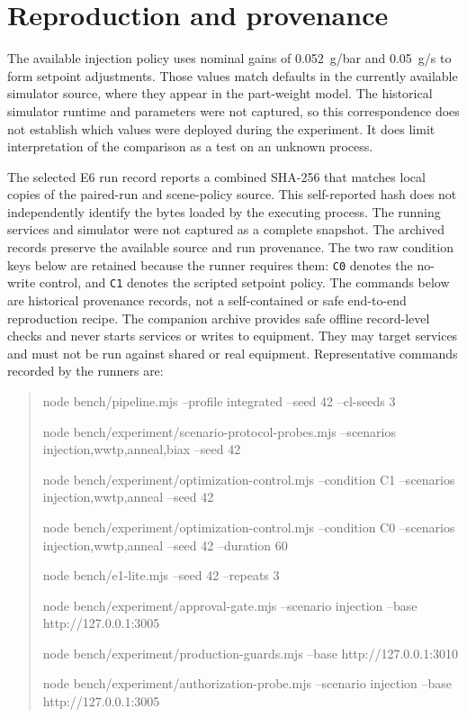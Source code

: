\documentclass[10pt]{article}
\begin{document}
\section*{Reproduction and provenance}
The available injection policy uses nominal gains of 0.052~g/bar and 0.05~g/s to form setpoint adjustments. Those values match defaults in the currently available simulator source, where they appear in the part-weight model. The historical simulator runtime and parameters were not captured, so this correspondence does not establish which values were deployed during the experiment. It does limit interpretation of the comparison as a test on an unknown process.

The selected E6 run record reports a combined SHA-256 that matches local copies of the paired-run and scene-policy source. This self-reported hash does not independently identify the bytes loaded by the executing process. The running services and simulator were not captured as a complete snapshot. The archived records preserve the available source and run provenance. The two raw condition keys below are retained because the runner requires them: \texttt{C0} denotes the no-write control, and \texttt{C1} denotes the scripted setpoint policy. The commands below are historical provenance records, not a self-contained or safe end-to-end reproduction recipe. The companion archive provides safe offline record-level checks and never starts services or writes to equipment. They may target services and must not be run against shared or real equipment. Representative commands recorded by the runners are:
\begin{quote}
\footnotesize\ttfamily\raggedright
node bench/pipeline.mjs --profile integrated --seed 42 --cl-seeds 3\par\smallskip
node bench/experiment/scenario-protocol-probes.mjs --scenarios injection,wwtp,anneal,biax --seed 42\par\smallskip
node bench/experiment/optimization-control.mjs --condition C1 --scenarios injection,wwtp,anneal --seed 42\par\smallskip
node bench/experiment/optimization-control.mjs --condition C0 --scenarios injection,wwtp,anneal --seed 42 --duration 60\par\smallskip
node bench/e1-lite.mjs --seed 42 --repeats 3\par\smallskip
node bench/experiment/approval-gate.mjs --scenario injection --base http://127.0.0.1:3005\par\smallskip
node bench/experiment/production-guards.mjs --base http://127.0.0.1:3010\par\smallskip
node bench/experiment/authorization-probe.mjs --scenario injection --base http://127.0.0.1:3005
\end{quote}
\end{document}
